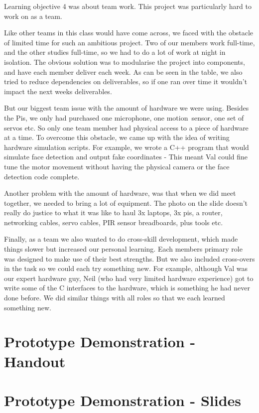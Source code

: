 \documentclass[11pt,a4paper,titlepage]{report}
\begin{document}
\begin{appendices}
Learning objective 4 was about team work. This project was particularly hard to work on as a team. 

Like other teams in this class would have come across, we faced with the obstacle of limited time for such an ambitious project. Two of our members work full-time, and the other studies full-time, so we had to do a lot of work at night in isolation. The obvious solution was to modularise the project into components, and have each member deliver each week. As can be seen in the table, we also tried to reduce dependencies on deliverables, so if one ran over time it wouldn’t impact the next weeks deliverables.

But our biggest team issue with the amount of hardware we were using. Besides the Pis, we only had purchased one microphone, one motion sensor, one set of servos etc. So only one team member had physical access to a piece of hardware at a time. To overcome this obstacle, we came up with the idea of writing hardware simulation scripts. For example, we wrote a C++ program that would simulate face detection and output fake coordinates - This meant Val could fine tune the motor movement without having the physical camera or the face detection code complete.

Another problem with the amount of hardware, was that when we did meet together, we needed to bring a lot of equipment. The photo on the slide doesn’t really do justice to what it was like to haul 3x laptops, 3x pis, a router, networking cables, servo cables, PIR sensor breadboards, plus tools etc.

Finally, as a team we also wanted to do cross-skill development, which made things slower but increased our personal learning. Each members primary role was designed to make use of their best strengths. But we also included cross-overs in the task so we could each try something new. For example, although Val was our expert hardware guy, Neil (who had very limited hardware experience) got to write some of the C interfaces to the hardware, which is something he had never done before. We did similar things with all roles so that we each learned something new.

\chapter{Prototype Demonstration - Handout}




\chapter{Prototype Demonstration - Slides}




\end{appendices}
\end{document}
